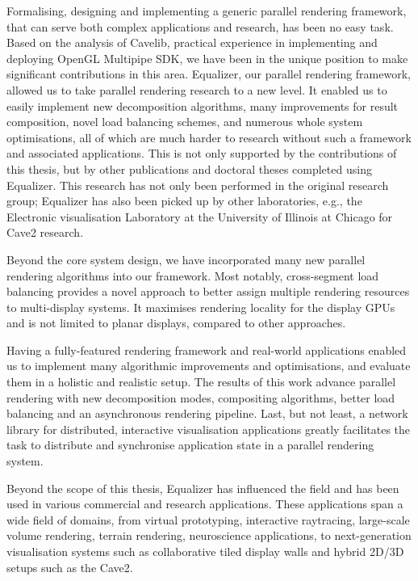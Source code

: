 Formalising, designing and implementing a generic parallel rendering framework,
that can serve both complex applications and research, has been no easy task.
Based on the analysis of Cavelib, practical experience in implementing and
deploying OpenGL Multipipe SDK, we have been in the unique position to make
significant contributions in this area. Equalizer, our parallel rendering
framework, allowed us to take parallel rendering research to a new level. It
enabled us to easily implement new decomposition algorithms, many
improvements for result composition, novel load balancing schemes, and numerous
whole system optimisations, all of which are much harder to research without such a
framework and associated applications. This is not only supported by the
contributions of this thesis, but by other publications and doctoral theses
completed using Equalizer. This research has not only been performed in the
original research group; Equalizer has also been picked up by other
laboratories, e.g., the Electronic visualisation Laboratory at the University
of Illinois at Chicago for Cave2 research.

Beyond the core system design, we have incorporated many new parallel rendering
algorithms into our framework. Most notably, cross-segment load balancing
provides a novel approach to better assign multiple rendering resources to
multi-display systems. It maximises rendering locality for the display GPUs and
is not limited to planar displays, compared to other approaches.

Having a fully-featured rendering framework and real-world applications enabled
us to implement many algorithmic improvements and optimisations, and evaluate
them in a holistic and realistic setup. The results of this work advance
parallel rendering with new decomposition modes, compositing algorithms, better
load balancing and an asynchronous rendering pipeline. Last, but not least, a
network library for distributed, interactive visualisation applications greatly
facilitates the task to distribute and synchronise application state in a
parallel rendering system.

Beyond the scope of this thesis, Equalizer has influenced the field and has
been used in various commercial and research applications. These applications
span a wide field of domains, from virtual prototyping, interactive raytracing,
large-scale volume rendering, terrain rendering, neuroscience applications, to
next-generation visualisation systems such as collaborative tiled display walls
and hybrid 2D/3D setups such as the Cave2.


